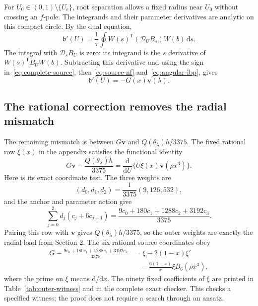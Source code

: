\documentclass[11pt,a4paper]{article}
\newcommand{\dd}{\mathrm d}
\newcommand{\tr}{\mathsf T}
\newcommand{\vv}{\mathbf v}
\begin{document}
For $U_0\in(0,1)\setminus\{U_e\}$, root separation allows a fixed
radius near $U_0$ without crossing an $f$-pole. The integrands and their
parameter derivatives are analytic on this compact circle. By the dual
equation,
\[
 \mathfrak b'(U)=\frac1\tau\oint
 W(s)^{\tr}(\mathcal D_U B_s)W(b)\,\dd s.
\]
The integral with $\mathcal D_s B_U$ is zero: its integrand is the
$s$ derivative of $W(s)^{\tr}B_UW(b)$. Subtracting this derivative and
using the sign in~\eqref{eq:complete-source}, then
\eqref{eq:source-nf} and~\eqref{eq:angular-ibp}, gives
\begin{equation}\label{eq:beta-derivative}
 \mathfrak b'(U)=-G(x)\vv(\lambda).
\end{equation}

\subsection{The rational correction removes the radial mismatch}
The remaining mismatch is between $G\vv$ and
$Q(\theta_\lambda)h/3375$. The fixed rational row $\xi(x)$ in the
appendix satisfies the functional identity
\begin{equation}\label{eq:functional-mismatch}
 G\vv-\frac{Q(\theta_\lambda)h}{3375}
   =\frac{\dd}{\dd U}\{U\xi(x)\vv(\rho x^3)\}.
\end{equation}
Here is its exact coordinate test. The three weights are
\[
 (d_0,d_1,d_2)=\frac1{3375}(9,126,532),
\]
and the anchor and parameter action give
\begin{equation}\label{eq:weight-calculation}
 \sum_{j=0}^2d_j(c_j+6c_{j+1})
 =\frac{9c_0+180c_1+1288c_2+3192c_3}{3375}.
\end{equation}
Pairing this row with $\vv$ gives $Q(\theta_\lambda)h/3375$,
so the outer weights are exactly the radial load from Section 2.
The six rational source coordinates obey
\begin{equation}\label{eq:outer-certificate}
 \begin{aligned}
 G-\frac{9c_0+180c_1+1288c_2+3192c_3}{3375}
 &=\xi-2(1-x)\xi'\\
 &\quad-\frac{6(1-x)}x\xi B_6(\rho x^3),
 \end{aligned}
\end{equation}
where the prime on $\xi$ means $\dd/\dd x$. The ninety fixed
coefficients of $\xi$ are printed in Table~\ref{tab:outer-witness} and
in the complete exact checker. This checks a specified witness; the
proof does not require a search through an ansatz.
\end{document}
